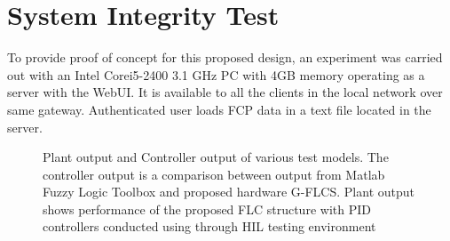 \section{System Integrity Test}
To provide proof of concept for this proposed design, an experiment was carried out with an Intel Corei5-2400 3.1 GHz PC with 4GB memory operating as a server with the WebUI. It is available to all the clients in the local network over same gateway. Authenticated user loads FCP data in a text file located in the server. 

\begin{figure}[h!]
	\centering
	 \qquad
	\caption{Plant output and Controller output of various test models. The controller output is a comparison between output from Matlab Fuzzy Logic Toolbox and proposed hardware G-FLCS. Plant output shows performance of the proposed FLC structure with PID controllers conducted using through HIL testing environment} 
	\label{fig:CompOut_tank}
\end{figure}

